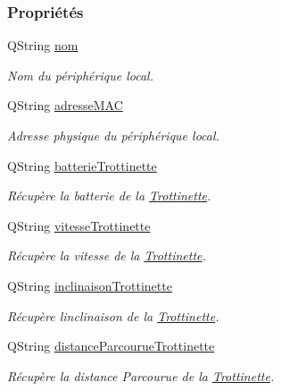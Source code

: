 \subsubsection*{Propriétés}
\begin{DoxyCompactItemize}
\item 
Q\+String \hyperlink{class_peripherique_local_a16dcebf91bf74b8e3f1c2d90b77dda29}{nom}
\begin{DoxyCompactList}\small\item\em Nom du périphérique local. \end{DoxyCompactList}\item 
Q\+String \hyperlink{class_peripherique_local_a76ccdcef703e7aff1f6f66dc615feba7}{adresse\+M\+AC}
\begin{DoxyCompactList}\small\item\em Adresse physique du périphérique local. \end{DoxyCompactList}\item 
Q\+String \hyperlink{class_peripherique_local_a7feac59a6fbe481321aa1734d13f05c2}{batterie\+Trottinette}
\begin{DoxyCompactList}\small\item\em Récupère la batterie de la \hyperlink{class_trottinette}{Trottinette}. \end{DoxyCompactList}\item 
Q\+String \hyperlink{class_peripherique_local_aa0a0ebf6468e8a2c3a15828122ee830a}{vitesse\+Trottinette}
\begin{DoxyCompactList}\small\item\em Récupère la vitesse de la \hyperlink{class_trottinette}{Trottinette}. \end{DoxyCompactList}\item 
Q\+String \hyperlink{class_peripherique_local_ab85a254ce801dcdebd6be972aea0638b}{inclinaison\+Trottinette}
\begin{DoxyCompactList}\small\item\em Récupère l\textquotesingle{}inclinaison de la \hyperlink{class_trottinette}{Trottinette}. \end{DoxyCompactList}\item 
Q\+String \hyperlink{class_peripherique_local_a6b583dc9b350baf3edcc0cbc1611a6c5}{distance\+Parcourue\+Trottinette}
\begin{DoxyCompactList}\small\item\em Récupère la distance Parcourue de la \hyperlink{class_trottinette}{Trottinette}. \end{DoxyCompactList}\item 

\end{DoxyCompactItemize}
